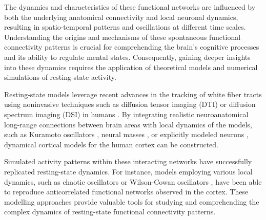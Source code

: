 \documentclass[../main.tex]{subfiles}
\begin{document}
The dynamics and characteristics of these functional networks are influenced by both the underlying anatomical connectivity and local neuronal dynamics, resulting in spatio-temporal patterns and oscillations at different time scales.
Understanding the origins and mechanisms of these spontaneous functional connectivity patterns is crucial for comprehending the brain's cognitive processes and its ability to regulate mental states.
Consequently, gaining deeper insights into these dynamics requires the application of theoretical models and numerical simulations of resting-state activity.

Resting-state models leverage recent advances in the tracking of white fiber tracts using noninvasive techniques such as diffusion tensor imaging (DTI) or diffusion spectrum imaging (DSI) in humans \citep{cabral_role_2011}.
By integrating realistic neuroanatomical long-range connections between brain areas with local dynamics of the models, such as Kuramoto oscillators \citep{cabral_role_2011}, neural masses \citep{deco_key_2009, honey_network_2007}, or explicitly modeled neurons \citep{deco_ongoing_2012, nakagawa_how_2014}, dynamical cortical models for the human cortex can be constructed.

Simulated activity patterns within these interacting networks have successfully replicated resting-state dynamics.
For instance, models employing various local dynamics, such as chaotic oscillators \citep{honey_network_2007} or Wilson-Cowan oscillators \citep{deco_key_2009}, have been able to reproduce anticorrelated functional networks observed in the cortex.
These modelling approaches provide valuable tools for studying and comprehending the complex dynamics of resting-state functional connectivity patterns.

\end{document}
